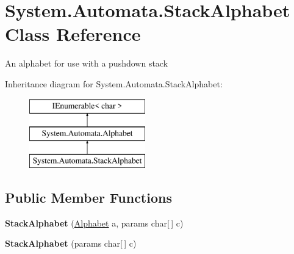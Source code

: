 \hypertarget{class_system_1_1_automata_1_1_stack_alphabet}{}\section{System.\+Automata.\+Stack\+Alphabet Class Reference}
\label{class_system_1_1_automata_1_1_stack_alphabet}


An alphabet for use with a pushdown stack  


Inheritance diagram for System.\+Automata.\+Stack\+Alphabet\+:\begin{figure}[H]
\begin{center}
\leavevmode
\includegraphics[height=3.000000cm]{class_system_1_1_automata_1_1_stack_alphabet}
\end{center}
\end{figure}
\subsection*{Public Member Functions}
\begin{DoxyCompactItemize}
\item 
\mbox{\label{class_system_1_1_automata_1_1_stack_alphabet_a515e787649e8cddad7fbe3d739d313d9}} 
{\bfseries Stack\+Alphabet} (\mbox{\hyperlink{class_system_1_1_automata_1_1_alphabet}{Alphabet}} a, params char\mbox{[}$\,$\mbox{]} c)
\item 
\mbox{\label{class_system_1_1_automata_1_1_stack_alphabet_a2cdeffdd37d35c216236ae9e33f5b532}} 
{\bfseries Stack\+Alphabet} (params char\mbox{[}$\,$\mbox{]} c)
\end{DoxyCompactItemize}
